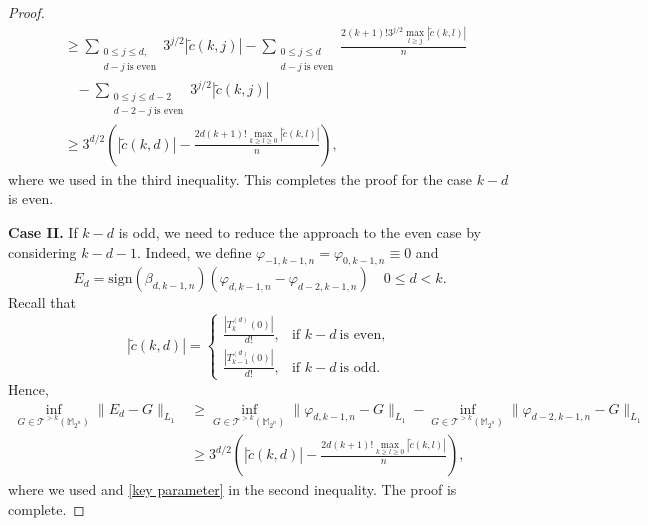 \documentclass{amsbook}
\theoremstyle{definition}
\theoremstyle{remark}
\numberwithin{section}{chapter}
\numberwithin{equation}{chapter}
\newcommand{\1}{\mathbf{1}}
\begin{document}
\begin{proof}
\begin{align*}
&\geq \sum_{\substack{0\leq j\leq d,\\d-j~\mbox{is even}}}3^{j/2}|\tilde{c}(k,j)|-\sum_{\substack{0\leq j\leq d\\d-j~\mbox{is even}}}\frac{2(k+1)!3^{j/2}\max_{l\geq j}|\tilde{c}(k,l)|}{n}\\
&\;\;\;-\sum_{\substack{0\leq j\leq d-2\\d-2-j~\mbox{is even}}}3^{j/2}|\tilde{c}(k,j)|\\
&\geq 3^{d/2}\left(|\tilde{c}(k,d)|-\frac{2d(k+1)!\max_{k\geq l\geq 0}|\tilde{c}(k,l)|}{n}\right),
\end{align*}
where we used \cite[Lemma 27]{IRRRY2021} in the third inequality. This completes the proof for the case $k-d$ is even.

{\bf Case II.} If $k-d$ is odd, we need to reduce the approach to the even case by considering $k-d-1$. Indeed, we define $\varphi_{-1,k-1,n}=\varphi_{0,k-1,n}\equiv 0$ and
\[
E_{d}=\mathrm{sign}(\beta_{d,k-1,n})(\varphi_{d,k-1,n}-\varphi_{d-2,k-1,n})\quad 0\leq d<k.
\]
Recall that
\begin{equation}\label{key parameter}
|\tilde{c}(k,d)|=
\begin{cases}
\frac{|T_{k}^{(d)}(0)|}{d!},&\mbox{if }k-d~\mbox{is even},\\
\frac{|T_{k-1}^{(d)}(0)|}{d!},&\mbox{if }k-d~\mbox{is odd}.
\end{cases}
\end{equation}
Hence,
\begin{align*}
\inf_{G\in \mathcal{T}^{>k}(\mathbb{M}_{2^n})}\|E_{d}-G\|_{L_{1}}&\geq \inf_{G\in \mathcal{T}^{>k}(\mathbb{M}_{2^n})}\|\varphi_{d,k-1,n}-G\|_{L_{1}}-\inf_{G\in \mathcal{T}^{>k}(\mathbb{M}_{2^n})}\|\varphi_{d-2,k-1,n}-G\|_{L_{1}}\\
&\geq 3^{d/2}\left(|\tilde{c}(k,d)|-\frac{2d(k+1)!\max_{k\geq l\geq 0}|\tilde{c}(k,l)|}{n}\right),
\end{align*}
where we used \cite[Lemma 27]{IRRRY2021} and \eqref{key parameter} in the second inequality. The proof is complete.
\end{proof}
\end{document}
